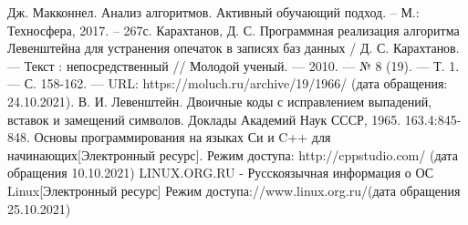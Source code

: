 \documentclass[12pt,a4paper]{report}
\begin{document}
\newpage
\renewcommand\bibname{Список литературы}
\makeatletter %
\def\@biblabel#1{#1. }
\makeatother
\begin{thebibliography}{2}
     Дж. Макконнел. Анализ алгоритмов. Активный обучающий подход. -- М.: Техносфера, 2017. -- 267с.
     Карахтанов, Д. С. Программная реализация алгоритма Левенштейна для устранения опечаток в записях баз данных
     / Д. С. Карахтанов. — Текст : непосредственный // Молодой ученый. — 2010. — № 8 (19). — Т. 1. — С. 158-162. — 
     URL: https://moluch.ru/archive/19/1966/ (дата обращения: 24.10.2021).
     В. И. Левенштейн. Двоичные коды с исправлением выпадений, вставок и замещений символов. Доклады Академий Наук СССР, 1965. 163.4:845-848.
     Основы программирования на языках Си и C++ для начинающих[Электронный ресурс]. Режим доступа: http://cppstudio.com/ (дата обращения 10.10.2021)
     LINUX.ORG.RU - Русскоязычная информация о ОС Linux[Электронный ресурс] Режим доступа://www.linux.org.ru/(дата обращения 25.10.2021)
     
\end{thebibliography}
\end{document}
